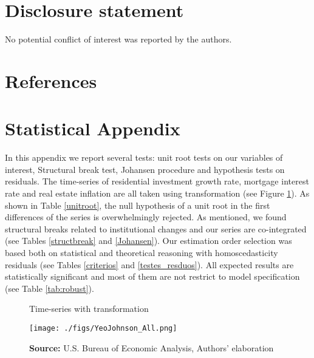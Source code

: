 \documentclass[12pt, a4paper]{article}
\begin{document}
\section*{Disclosure statement}
\label{sec:orgdc8e4b6}
No potential conflict of interest was reported by the authors.

\section*{References}
\label{sec:org163785b}
\printbibliography[heading=none]


\appendix
\section{Statistical Appendix}
\label{sec:org4ccaae8}
\label{appen:A}

In this appendix we report several tests: unit root tests on our variables of interest, Structural break test, Johansen procedure and hypothesis tests on residuals. 
The time-series of residential investment growth rate, mortgage interest rate and real estate inflation are all taken using \textcite{yeo_new_2000} transformation (see Figure \ref{YeoJhonson}).
As shown in Table \ref{unitroot}, the null hypothesis of a unit root in the first differences of the series is overwhelmingly rejected.
As mentioned, we found structural breaks related to institutional changes and our series are co-integrated (see Tables \ref{structbreak} and \ref{Johansen}).
Our estimation order selection was based both on statistical and theoretical reasoning with homoscedasticity residuals (see Tables \ref{criterios} and \ref{testes_resduos}).
All expected results are statistically significant and most of them are not restrict to model specification (see Table \ref{tab:robust}).

\begin{figure}[htb]
	\centering
	\caption{Time-series with \textcite{yeo_new_2000} transformation}
	\label{YeoJhonson}
	\texttt{[image: ./figs/YeoJohnson\_All.png]}
	\caption*{\textbf{Source:} U.S. Bureau of Economic Analysis, Authors' elaboration}
\end{figure}






\end{document}
